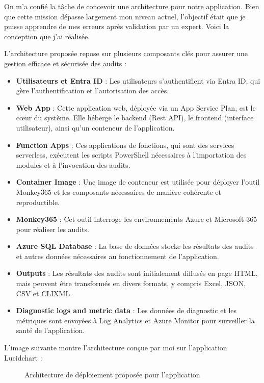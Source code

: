 On m'a confié la tâche de concevoir une architecture pour notre application. Bien que cette mission dépasse largement mon niveau actuel, l'objectif était que je puisse apprendre de mes erreurs après validation par un expert. Voici la conception que j'ai réalisée.

L'architecture proposée repose sur plusieurs composants clés pour assurer une gestion efficace et sécurisée des audits :

\begin{itemize}
    \item \textbf{Utilisateurs et Entra ID} : Les utilisateurs s'authentifient via Entra ID, qui gère l'authentification et l'autorisation des accès.
    \item \textbf{Web App} : Cette application web, déployée via un App Service Plan, est le cœur du système. Elle héberge le backend (Rest API), le frontend (interface utilisateur), ainsi qu'un conteneur de l'application.
    \item \textbf{Function Apps} : Ces applications de fonctions, qui sont des services serverless, exécutent les scripts PowerShell nécessaires à l'importation des modules et à l'invocation des audits.
    \item \textbf{Container Image} : Une image de conteneur est utilisée pour déployer l'outil Monkey365 et les composants nécessaires de manière cohérente et reproductible.
    \item \textbf{Monkey365} : Cet outil interroge les environnements Azure et Microsoft 365 pour réaliser les audits.
    \item \textbf{Azure SQL Database} : La base de données stocke les résultats des audits et autres données nécessaires au fonctionnement de l'application.
    \item \textbf{Outputs} : Les résultats des audits sont initialement diffusés en page HTML, mais peuvent être transformés en divers formats, y compris Excel, JSON, CSV et CLIXML.
    \item \textbf{Diagnostic logs and metric data} : Les données de diagnostic et les métriques sont envoyées à Log Analytics et Azure Monitor pour surveiller la santé de l'application.
\end{itemize}

L'image suivante montre l'architecture conçue par moi sur l'application Lucidchart :

\begin{figure}[H]
    \centering
    \caption{Architecture de déploiement proposée pour l'application}
\end{figure}

